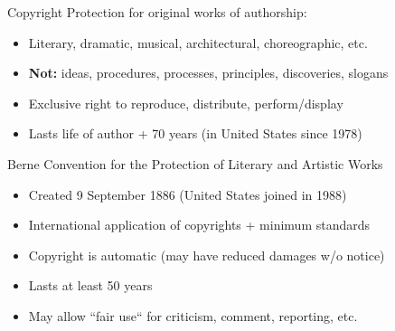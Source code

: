 \documentclass{beamer}
\begin{document}
\begin{frame}{Copyright}
Protection for original works of authorship:
\begin{itemize}
\item Literary, dramatic, musical, architectural, choreographic, etc.
\item \textbf{Not:} ideas, procedures, processes, principles, discoveries, slogans
\item Exclusive right to reproduce, distribute, perform/display
\item Lasts life of author + 70 years (in United States since 1978)
\end{itemize}
\bigskip
Berne Convention for the Protection of Literary and Artistic Works
\begin{itemize}
\item Created 9 September 1886 (United States joined in 1988)
\item International application of copyrights + minimum standards 
\item Copyright is automatic (may have reduced damages w/o notice)
\item Lasts at least 50 years
\item May allow ``fair use`` for criticism, comment, reporting, etc.
\end{itemize}
\end{frame}
\end{document}

